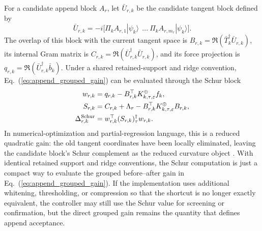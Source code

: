 \documentclass[
  reprint,
  amsmath,
  amssymb,
  aps,
  pra,
  nofootinbib,
  superscriptaddress,
  floatfix
]{revtex4-2}
\newcommand{\eps}{\varepsilon}
\newcommand{\ket}[1]{|#1\rangle}
\begin{document}
For a candidate append block $A_r$, let $\bar U_{r,k}$ be the candidate tangent block
defined by
\[
\bar U_{r,k}
=-i\bigl[
 \Pi_k A_{r,1}\ket{\psi_k}\ ~...~
 \Pi_k A_{r,m_r}\ket{\psi_k}
\bigr].
\]
The overlap of this block with the current tangent space is $B_{r,k}=\Re(\bar T_k^\dagger\bar U_{r,k})$, its internal Gram matrix is $C_{r,k}=\Re(\bar U_{r,k}^\dagger\bar U_{r,k})$, and its force projection is $q_{r,k}=\Re(\bar U_{r,k}^\dagger\bar b_k)$. Under a shared retained-support and ridge convention, Eq.~(\ref{eq:append_grouped_gain}) can be evaluated through the Schur block
\begin{equation}
\begin{aligned}
w_{r,k}&=q_{r,k}-B_{r,k}^{\top}K_{k,\tau,\eps}^{\oplus}f_k,\\
S_{r,k}&=C_{r,k}+\Lambda_r-B_{r,k}^{\top}K_{k,\tau,\eps}^{\oplus}B_{r,k},\\
\Delta_{r,k}^{\rm Schur}&=w_{r,k}^{\top}(S_{r,k})_{\tau}^{\dagger}w_{r,k}.
\end{aligned}
\label{eq:append_schur_block}
\end{equation}
In numerical-optimization and partial-regression language, this is a reduced quadratic gain: the old tangent coordinates have been locally eliminated, leaving the candidate block's Schur complement as the reduced curvature object \cite{FrischWaugh1933,Lovell1963,NocedalWright2006}. With identical retained support and ridge conventions, the Schur computation is just a compact way to evaluate the grouped before--after gain in Eq.~(\ref{eq:append_grouped_gain}).  If the implementation uses additional whitening, thresholding, or compression so that the shortcut is no longer exactly equivalent, the controller may still use the Schur value for screening or confirmation, but the direct grouped gain remains the quantity that defines append acceptance.
\end{document}

